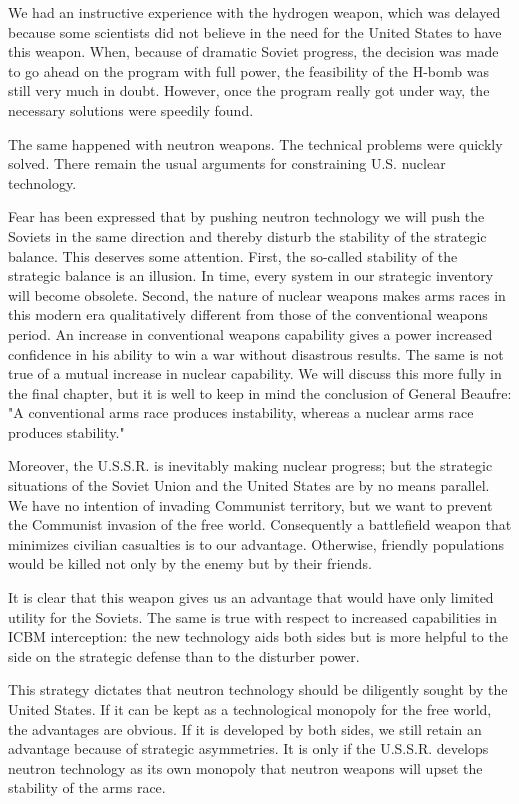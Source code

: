 We had an instructive experience with the hydrogen weapon, which was delayed because some scientists did not believe in the need for the United States to have this weapon. When, because of dramatic Soviet progress, the decision was made to go ahead on the program with full power, the feasibility of the H-bomb was still very much in doubt. However, once the program really got under way, the necessary solutions were speedily found.

The same happened with neutron weapons. The technical problems were quickly solved. There remain the usual arguments for constraining U.S. nuclear technology.

Fear has been expressed that by pushing neutron technology we will push the Soviets in the same direction and thereby disturb the stability of the strategic balance. This deserves some attention. First, the so-called stability of the strategic balance is an illusion. In time, every system in our strategic inventory will become obsolete. Second, the nature of nuclear weapons makes arms races in this modern era qualitatively different from those of the conventional weapons period. An increase in conventional weapons capability gives a power increased confidence in his ability to win a war without disastrous results. The same is not true of a mutual increase in nuclear capability. We will discuss this more fully in the final chapter, but it is well to keep in mind the conclusion of General Beaufre: "A conventional arms race produces instability, whereas a nuclear arms race produces stability."

Moreover, the U.S.S.R. is inevitably making nuclear progress; but the strategic situations of the Soviet Union and the United States are by no means parallel. We have no intention of invading Communist territory, but we want to prevent the Communist invasion of the free world. Consequently a battlefield weapon that minimizes civilian casualties is to our advantage. Otherwise, friendly populations would be killed not only by the enemy but by their friends.

It is clear that this weapon gives us an advantage that would have only limited utility for the Soviets. The same is true with respect to increased capabilities in ICBM interception: the new technology aids both sides but is more helpful to the side on the strategic defense than to the disturber power.

This strategy dictates that neutron technology should be diligently sought by the United States. If it can be kept as a technological monopoly for the free world, the advantages are obvious. If it is developed by both sides, we still retain an advantage because of strategic asymmetries. It is only if the U.S.S.R. develops neutron technology as its own monopoly that neutron weapons will upset the stability of the arms race.

